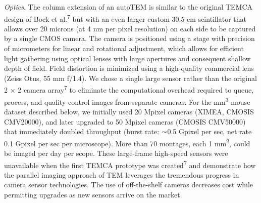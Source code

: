 \documentclass{article}
\begin{document}
\emph{Optics}. The column extension of an autoTEM is similar to the original TEMCA design of Bock et al.\textsuperscript{7} but with an even larger custom 30.5 cm scintillator that allows over 20 microns (at 4 nm per pixel resolution) on each side to be captured by a single CMOS camera. The camera is positioned using a stage with precision of micrometers for linear and rotational adjustment, which allows for efficient light gathering using optical lenses with large apertures and consequent shallow depth of field. Field distortion is minimized using a high-quality commercial lens (Zeiss Otus, 55 mm f/1.4). We chose a single large sensor rather than the original 2 × 2 camera array\textsuperscript{7} to eliminate the computational overhead required to queue, process, and quality-control images from separate cameras. For the mm\textsuperscript{3} mouse dataset described below, we initially used 20 Mpixel cameras (XIMEA, CMOSIS CMV20000), and later upgraded to 50 Mpixel cameras (CMOSIS CMV50000) that immediately doubled throughput (burst rate: ∼0.5 Gpixel per sec, net rate 0.1 Gpixel per sec per microscope). More than 70 montages, each 1 mm\textsuperscript{2}, could be imaged per day per scope. These large-frame high-speed sensors were unavailable when the first TEMCA prototype was created\textsuperscript{7} and demonstrate how the parallel imaging approach of TEM leverages the tremendous progress in camera sensor technologies. The use of off-the-shelf cameras decreases cost while permitting upgrades as new sensors arrive on the market.
\end{document}
